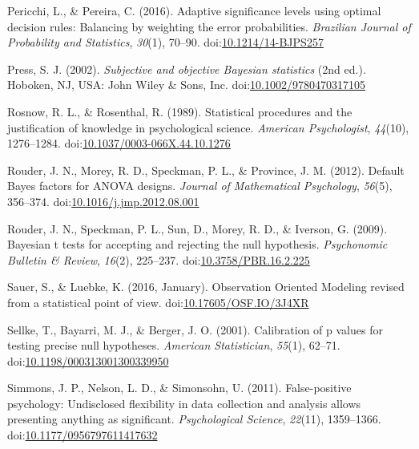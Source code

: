 \documentclass[,man, mask]{apa6}
\theoremstyle{definition}
\theoremstyle{definition}
\theoremstyle{definition}
\theoremstyle{remark}
\begin{document}
\hypertarget{ref-Pericchi2016}{}
Pericchi, L., \& Pereira, C. (2016). Adaptive significance levels using
optimal decision rules: Balancing by weighting the error probabilities.
\emph{Brazilian Journal of Probability and Statistics}, \emph{30}(1),
70--90.
doi:\href{https://doi.org/10.1214/14-BJPS257}{10.1214/14-BJPS257}

\hypertarget{ref-Press2002}{}
Press, S. J. (2002). \emph{Subjective and objective Bayesian statistics}
(2nd ed.). Hoboken, NJ, USA: John Wiley \& Sons, Inc.
doi:\href{https://doi.org/10.1002/9780470317105}{10.1002/9780470317105}

\hypertarget{ref-Rosnow1989}{}
Rosnow, R. L., \& Rosenthal, R. (1989). Statistical procedures and the
justification of knowledge in psychological science. \emph{American
Psychologist}, \emph{44}(10), 1276--1284.
doi:\href{https://doi.org/10.1037/0003-066X.44.10.1276}{10.1037/0003-066X.44.10.1276}

\hypertarget{ref-Rouder2012}{}
Rouder, J. N., Morey, R. D., Speckman, P. L., \& Province, J. M. (2012).
Default Bayes factors for ANOVA designs. \emph{Journal of Mathematical
Psychology}, \emph{56}(5), 356--374.
doi:\href{https://doi.org/10.1016/j.jmp.2012.08.001}{10.1016/j.jmp.2012.08.001}

\hypertarget{ref-Rouder2009}{}
Rouder, J. N., Speckman, P. L., Sun, D., Morey, R. D., \& Iverson, G.
(2009). Bayesian t tests for accepting and rejecting the null
hypothesis. \emph{Psychonomic Bulletin \& Review}, \emph{16}(2),
225--237.
doi:\href{https://doi.org/10.3758/PBR.16.2.225}{10.3758/PBR.16.2.225}

\hypertarget{ref-Sauer2016}{}
Sauer, S., \& Luebke, K. (2016, January). Observation Oriented Modeling
revised from a statistical point of view.
doi:\href{https://doi.org/10.17605/OSF.IO/3J4XR}{10.17605/OSF.IO/3J4XR}

\hypertarget{ref-Sellke2001}{}
Sellke, T., Bayarri, M. J., \& Berger, J. O. (2001). Calibration of p
values for testing precise null hypotheses. \emph{American
Statistician}, \emph{55}(1), 62--71.
doi:\href{https://doi.org/10.1198/000313001300339950}{10.1198/000313001300339950}

\hypertarget{ref-Simmons2011}{}
Simmons, J. P., Nelson, L. D., \& Simonsohn, U. (2011). False-positive
psychology: Undisclosed flexibility in data collection and analysis
allows presenting anything as significant. \emph{Psychological Science},
\emph{22}(11), 1359--1366.
doi:\href{https://doi.org/10.1177/0956797611417632}{10.1177/0956797611417632}
\end{document}
